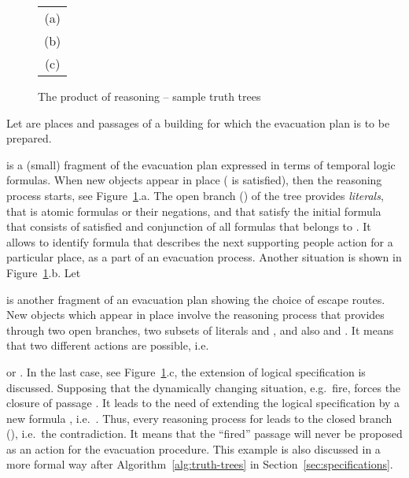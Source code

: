 \documentclass[runningheads,a4paper]{llncs}
\begin{document}
\begin{figure}[htb]
\begin{center}
{\small
\begin{tabular}{c}
\framebox{
\pstree[levelsep=4.0ex,nodesep=2pt,treesep=25pt]
       {\TR{}}
       {\pstree{\TR{}}
         {{\TR{}}{\pstree{\TR{}}{\textcolor{blue}{}}}}}} (a)\vspace{.5mm}\\
\framebox{
\pstree[levelsep=4.0ex,nodesep=2pt,treesep=25pt]
       {\TR{}}
       {\pstree{\TR{}}
         {{\pstree{\TR{}}{{\TR{}}{\pstree{\TR{}}{\textcolor{blue}{}}}}}
         {\pstree{\TR{}}{{\TR{}}{\pstree{\TR{}}{\textcolor{blue}{}}}}}}}}
         (b)\vspace{.5mm}\\
\framebox{
\pstree[levelsep=4.0ex,nodesep=2pt,treesep=25pt]
       {\TR{}}
       {\pstree{\TR{}}
       {{\pstree{\TR{}}
         {{\pstree{\TR{}}{{\TR{}}{\pstree{\TR{}}{\textcolor{blue}{}}}}}
         {\pstree{\TR{}}{{\TR{}}{\pstree{\TR{}}{\textcolor{blue}{}}}}}}}}}
         }
         (c)
\end{tabular}
}
\end{center}
\caption{The product of reasoning -- sample truth trees}
\label{fig:truth-trees-reasoning}
\end{figure}
Let 
are places and passages of a building
for which the evacuation plan is to be prepared.

is a (small) fragment of the evacuation plan expressed in terms of temporal logic formulas.
When new objects appear in place  ( is satisfied), then the reasoning process starts,
see Figure~\ref{fig:truth-trees-reasoning}.a.
The open branch (\textcolor{blue}{}) of the tree provides
\emph{literals}, that is atomic formulas or their negations,
 and  that satisfy
the initial formula that consists of satisfied  and conjunction of all formulas that belongs to .
It allows to identify formula  that describes
the next supporting people action for a particular place, as a part of an evacuation process.
Another situation is shown in Figure~\ref{fig:truth-trees-reasoning}.b.
Let

is another fragment of an evacuation plan showing the choice of escape routes.
New objects which appear in place  involve the reasoning process that
provides through two open branches, two subsets of literals  and ,
and also  and .
It means that two different actions are possible,
i.e.\

or
.
In the last case,
see Figure~\ref{fig:truth-trees-reasoning}.c,
the extension of logical specification  is discussed.
Supposing that the dynamically changing situation, e.g.\ fire, forces the closure of passage .
It leads to the need of extending the logical specification by a new formula ,
i.e.\ .
Thus, every reasoning process for  leads to the closed branch (\textcolor{blue}{}),
i.e.\ the contradiction.
It means that the ``fired'' passage will never be proposed as an action for the evacuation procedure.
This example is also discussed in a more formal way after Algorithm~\ref{alg:truth-trees} in Section~\ref{sec:specifications}.
\end{document}
